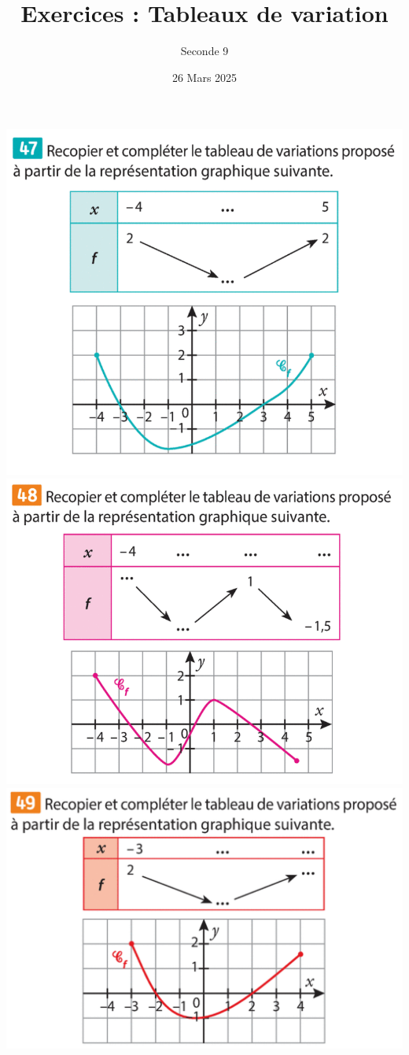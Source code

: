 \documentclass{article}
\title{Exercices : Tableaux de variation}
\author{Seconde 9}
\date{26 Mars 2025}
\begin{document}
\maketitle

\begin{minipage}{0.45\textwidth}
\begin{center}
\includegraphics[width=\textwidth]{Exercice_1.png}
\includegraphics[width=\textwidth]{Exercice_2.png}
\includegraphics[width=\textwidth]{Exercice_3.png}

\end{center}
\end{minipage}
\end{document}
